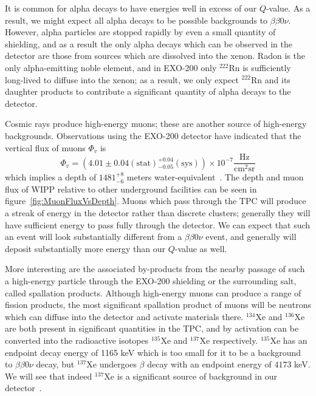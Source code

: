 It is common for alpha decays to have energies well in excess of our $Q$-value.  As a result, we might expect all alpha decays to be possible backgrounds to $\beta\beta 0\nu$.  However, alpha particles are stopped rapidly by even a small quantity of shielding, and as a result the only alpha decays which can be observed in the detector are those from sources which are dissolved into the xenon.  Radon is the only alpha-emitting noble element, and in EXO-200 only $^{222}$Rn is sufficiently long-lived to diffuse into the xenon; as a result, we only expect $^{222}$Rn and its daughter products to contribute a significant quantity of alpha decays to the detector.

Cosmic rays produce high-energy muons; these are another source of high-energy backgrounds.  Observations using the EXO-200 detector have indicated that the vertical flux of muons $\Phi_v$ is
\begin{equation}
\Phi_v =  \left(4.01 \pm 0.04(\mathrm{stat}){}^{+0.04}_{-0.05} (\mathrm{sys})\right) \times 10^{-7} \frac{\mathrm{Hz}}{\mathrm{cm}^2 \mathrm{sr}}
\end{equation}
which implies a depth of $1481^{+8}_{-6}$ meters water-equivalent~\cite{ThesisSteve}.  The depth and muon flux of WIPP relative to other underground facilities can be seen in figure~\ref{fig:MuonFluxVsDepth}.  Muons which pass through the TPC will produce a streak of energy in the detector rather than discrete clusters; generally they will have sufficient energy to pass fully through the detector.  We can expect that such an event will look substantially different from a $\beta\beta 0\nu$ event, and generally will deposit substantially more energy than our $Q$-value as well.

More interesting are the associated by-products from the nearby passage of such a high-energy particle through the EXO-200 shielding or the surrounding salt, called spallation products.  Although high-energy muons can produce a range of fission products, the most significant spallation product of muons will be neutrons which can diffuse into the detector and activate materials there.  $^{134}$Xe and $^{136}$Xe are both present in significant quantities in the TPC, and by activation can be converted into the radioactive isotopes $^{135}$Xe and $^{137}$Xe respectively.  $^{135}$Xe has an endpoint decay energy of 1165 keV which is too small for it to be a background to $\beta\beta 0\nu$ decay, but $^{137}$Xe undergoes $\beta$ decay with an endpoint energy of $4173$ keV.  We will see that indeed $^{137}$Xe is a significant source of background in our detector~\cite{NewEXObb0nPaper_2014,NeutronCaptureGammas}.

